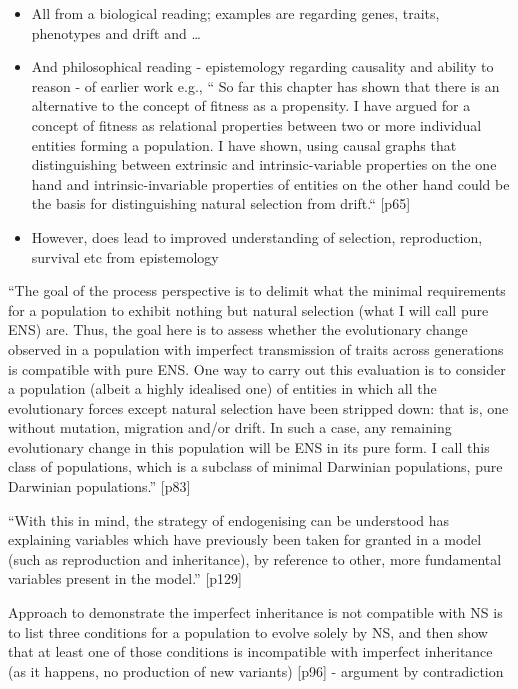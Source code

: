	\begin{itemize}
		\item
		
		All from a biological reading; examples are regarding genes, traits,
		phenotypes and drift and \ldots{}
		
		\item
		
		And philosophical reading - epistemology regarding causality and
		ability to reason - of earlier work e.g., `` So far this chapter has
		shown that there is an alternative to the concept of fitness as a
		propensity. I have argued for a concept of fitness as relational
		properties between two or more individual entities forming a
		population. I have shown, using causal graphs that distinguishing
		between extrinsic and intrinsic-variable properties on the one hand
		and intrinsic-invariable properties of entities on the other hand
		could be the basis for distinguishing natural selection from
		drift.`` {[}p65{]}
		
		\item
		
		However, does lead to improved understanding of selection,
		reproduction, survival etc from epistemology
		
	\end{itemize}

	``The goal of the process perspective is to delimit what the minimal
	requirements for a population to exhibit nothing but natural selection
	(what I will call pure ENS) are. Thus, the goal here is to assess
	whether the evolutionary change observed in a population with
	imperfect transmission of traits across generations is compatible with
	pure ENS. One way to carry out this evaluation is to consider a
	population (albeit a highly idealised one) of entities in which all
	the evolutionary forces except natural selection have been stripped
	down: that is, one without mutation, migration and/or drift. In such a
	case, any remaining evolutionary change in this population will be ENS
	in its pure form. I call this class of populations, which is a
	subclass of minimal Darwinian populations, pure Darwinian
	populations.'' {[}p83{]}

	``With this in mind, the strategy of endogenising can be understood
	has explaining variables which have previously been taken for granted
	in a model (such as reproduction and inheritance), by reference to
	other, more fundamental variables present in the model.'' {[}p129{]}

	
	Approach to demonstrate the imperfect inheritance is not compatible
	with NS is to list three conditions for a population to evolve solely
	by NS, and then show that at least one of those conditions is
	incompatible with imperfect inheritance (as it happens, no production
	of new variants) {[}p96{]} - argument by contradiction

